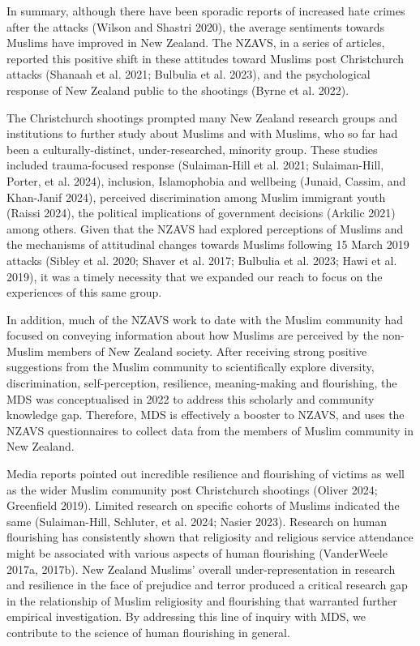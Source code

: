 \documentclass[
]{interact}
\begin{document}
In summary, although there have been sporadic reports of increased hate
crimes after the attacks (Wilson and Shastri 2020), the average
sentiments towards Muslims have improved in New Zealand. The NZAVS, in a
series of articles, reported this positive shift in these attitudes
toward Muslims post Christchurch attacks (Shanaah et al. 2021; Bulbulia
et al. 2023), and the psychological response of New Zealand public to
the shootings (Byrne et al. 2022).

The Christchurch shootings prompted many New Zealand research groups and
institutions to further study about Muslims and with Muslims, who so far
had been a culturally-distinct, under-researched, minority group. These
studies included trauma-focused response (Sulaiman-Hill et al. 2021;
Sulaiman-Hill, Porter, et al. 2024), inclusion, Islamophobia and
wellbeing (Junaid, Cassim, and Khan-Janif 2024), perceived
discrimination among Muslim immigrant youth (Raissi 2024), the political
implications of government decisions (Arkilic 2021) among others. Given
that the NZAVS had explored perceptions of Muslims and the mechanisms of
attitudinal changes towards Muslims following 15 March 2019 attacks
(Sibley et al. 2020; Shaver et al. 2017; Bulbulia et al. 2023; Hawi et
al. 2019), it was a timely necessity that we expanded our reach to focus
on the experiences of this same group.

In addition, much of the NZAVS work to date with the Muslim community
had focused on conveying information about how Muslims are perceived by
the non-Muslim members of New Zealand society. After receiving strong
positive suggestions from the Muslim community to scientifically explore
diversity, discrimination, self-perception, resilience, meaning-making
and flourishing, the MDS was conceptualised in 2022 to address this
scholarly and community knowledge gap. Therefore, MDS is effectively a
booster to NZAVS, and uses the NZAVS questionnaires to collect data from
the members of Muslim community in New Zealand.

Media reports pointed out incredible resilience and flourishing of
victims as well as the wider Muslim community post Christchurch
shootings (Oliver 2024; Greenfield 2019). Limited research on specific
cohorts of Muslims indicated the same (Sulaiman-Hill, Schluter, et al.
2024; Nasier 2023). Research on human flourishing has consistently shown
that religiosity and religious service attendance might be associated
with various aspects of human flourishing (VanderWeele 2017a, 2017b).
New Zealand Muslims' overall under-representation in research and
resilience in the face of prejudice and terror produced a critical
research gap in the relationship of Muslim religiosity and flourishing
that warranted further empirical investigation. By addressing this line
of inquiry with MDS, we contribute to the science of human flourishing
in general.
\end{document}
